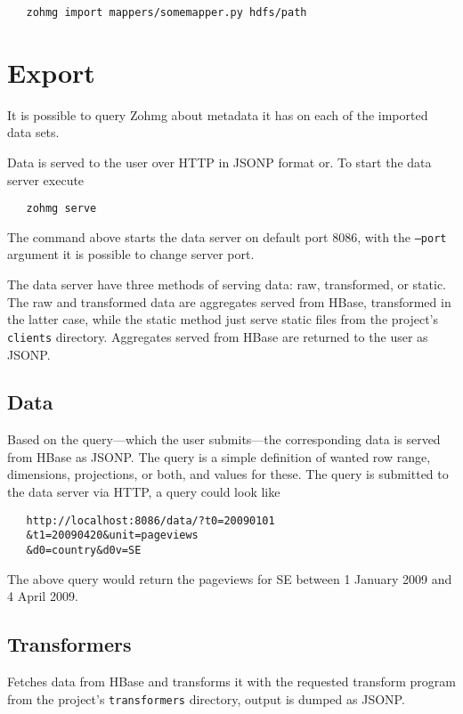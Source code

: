 \begin{verbatim}
   zohmg import mappers/somemapper.py hdfs/path
\end{verbatim}


\section{Export}

It is possible to query Zohmg about metadata it has on each of the imported
data sets.

Data is served to the user over HTTP in JSONP format or. To start the data
server execute

\begin{verbatim}
   zohmg serve
\end{verbatim}

The command above starts the data server on default port 8086, with the
\texttt{--port} argument it is possible to change server port.

The data server have three methods of serving data: raw, transformed, or
static. The raw and transformed data are aggregates served from HBase,
transformed in the latter case, while the static method just serve static
files from the project's \texttt{clients} directory. Aggregates served from
HBase are returned to the user as JSONP.


\subsection*{Data}

Based on the query---which the user submits---the corresponding data is
served from HBase as JSONP. The query is a simple definition of wanted row
range, dimensions, projections, or both, and values for these. The query is
submitted to the data server via HTTP, a query could look like

\begin{verbatim}
   http://localhost:8086/data/?t0=20090101
   &t1=20090420&unit=pageviews
   &d0=country&d0v=SE
\end{verbatim}

\noindent The above query would return the pageviews for SE between 1 January
2009 and 4 April 2009.


\subsection*{Transformers}

Fetches data from HBase and transforms it with the requested transform
program from the project's \texttt{transformers} directory, output is
dumped as JSONP.

